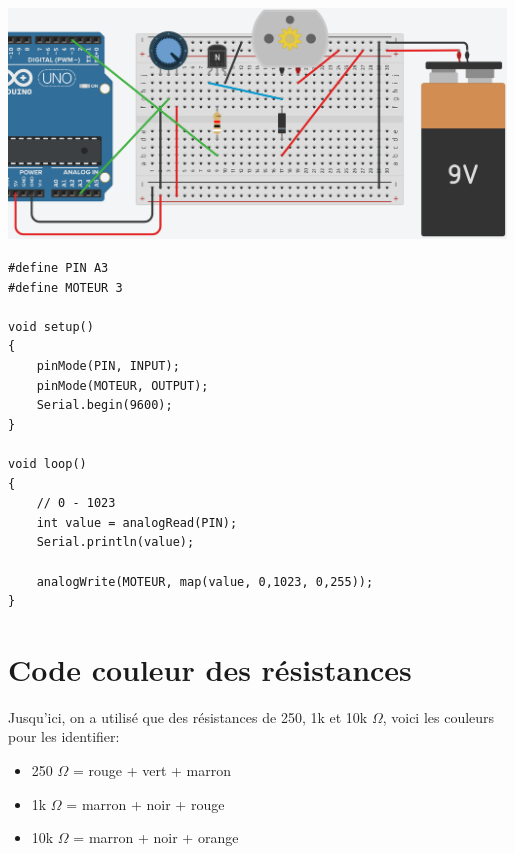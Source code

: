 \documentclass[a4paper]{article}
\begin{document}
\begin{center}
    \includegraphics[width=0.99\textwidth]{images/commande-moteur-1.PNG}
\end{center}
\begin{lstlisting}[frame=single]
#define PIN A3
#define MOTEUR 3

void setup()
{
    pinMode(PIN, INPUT);
    pinMode(MOTEUR, OUTPUT);
    Serial.begin(9600);
}

void loop()
{
    // 0 - 1023
    int value = analogRead(PIN);
    Serial.println(value);

    analogWrite(MOTEUR, map(value, 0,1023, 0,255));
}    
\end{lstlisting}




















\newpage \appendix




















\section{Code couleur des résistances}





Jusqu'ici, on a utilisé que des résistances de 250, 1k et 10k $ \Omega $, voici les couleurs pour les identifier:
\begin{itemize}
    \item 250 $ \Omega $ = rouge + vert + marron
    \item 1k $ \Omega $ = marron + noir + rouge
    \item 10k $ \Omega $ = marron + noir + orange
\end{itemize}
\end{document}

